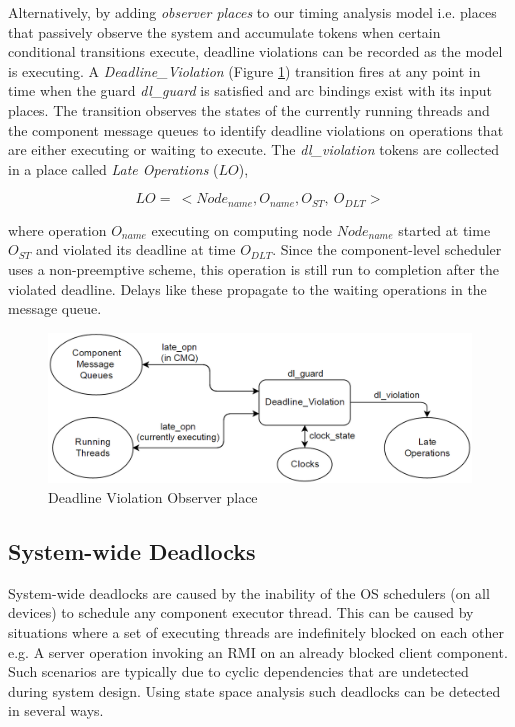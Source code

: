 Alternatively, by adding \emph{observer places} to our timing analysis model i.e. places that passively observe the system and accumulate tokens when certain conditional transitions execute, deadline violations can be recorded as the model is executing. A \emph{Deadline\_Violation} (Figure \ref{fig:DL}) transition fires at any point in time when the guard \emph{dl\_guard} is satisfied and arc bindings exist with its input places. The transition observes the states of the currently running threads and the component message queues to identify deadline violations on operations that are either executing or waiting to execute. The \emph{dl\_violation} tokens are collected in a place called \emph{Late Operations} ($LO$), 

\begin{equation}
\label{eq:DLV}
LO = \ <Node_{name}, O_{name}, O_{ST}, \ O_{DLT}>
\end{equation}

where operation $O_{name}$ executing on computing node $Node_{name}$ started at time $O_{ST}$ and violated its deadline at time $O_{DLT}$. Since the component-level scheduler uses a non-preemptive scheme, this operation is still run to completion after the violated deadline. Delays like these propagate to the waiting operations in the message queue.

\begin{figure}[htb]
	\centering
	\includegraphics[width=\textwidth]{./img/Deadline_Violations.png}
	\caption{Deadline Violation Observer place}
	\label{fig:DL}
\end{figure}
\FloatBarrier

\subsection{System-wide Deadlocks}

System-wide deadlocks are caused by the inability of the OS schedulers (on all devices) to schedule any component executor thread. This can be caused by situations where a set of executing threads are indefinitely blocked on each other e.g. A server operation invoking an RMI on an already blocked client component. Such scenarios are typically due to cyclic dependencies that are undetected during system design. Using state space analysis such deadlocks can be detected in several ways.

